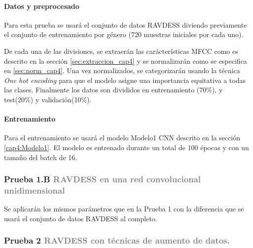 \documentclass[11pt,a4paper,spanish]{book}
\begin{document}
	\hfill\begin{minipage}{\dimexpr\textwidth-1cm}
		\paragraph{Datos y preprocesado}
		Para esta prueba se usará el conjunto de datos RAVDESS diviendo previamente el conjunto de entrenamiento por género (720 muestras iniciales por cada uno). 
		
		De cada una de las divisiones, se extraerán las carácterísticas MFCC como es descrito en la sección \ref{sec:extraccion_cap4} y se normalizarán como se especifica en \ref{sec:norm_cap4}. Una vez normalizados, se categorizarán usando la técnica \emph{One hot encoding} para que el modelo asigne una importancia equitativa a todas las clases.
		Finalmente los datos son divididos en entrenamiento (70\%), y test(20\%) y validación(10\%).
		
		\paragraph{Entrenamiento}
		Para el entrenamiento se usará el modelo Modelo1 CNN descrito en la sección \ref{cap4:Modelo1}. El modelo es entrenado durante un total de 100 épocas y con un tamaño del batch de 16.
	\end{minipage}
	

	\subsubsection[]{\large Prueba 1.B {\normalsize \textcolor{Gray}{RAVDESS en una red convolucional unidimensional}}}
	Se aplicarán los mismos parámetros que en la Prueba 1 con la diferencia que se usará el conjunto de datos RAVDESS al completo.

	\subsubsection{\large Prueba 2  {\normalsize \textcolor{Gray}{RAVDESS con técnicas de aumento de datos.}}}
\end{document}
